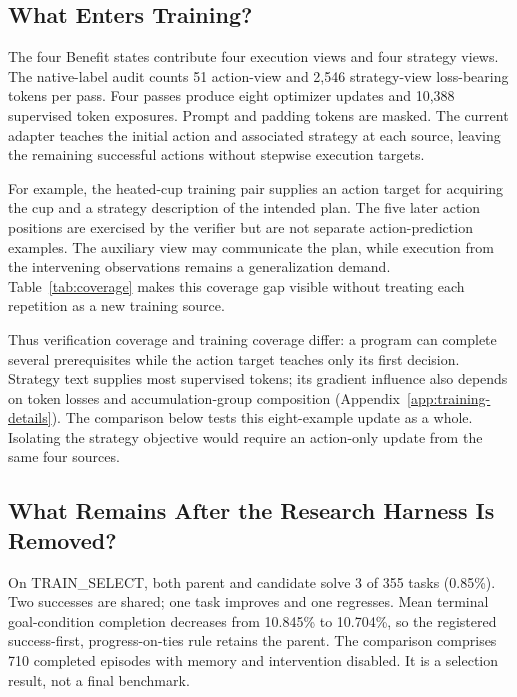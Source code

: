 \subsection{What Enters Training?}
\label{sec:target-results}\label{sec:ablations}
The four Benefit states contribute four execution views and four strategy
views. The native-label audit counts 51 action-view and 2,546 strategy-view
loss-bearing tokens per pass. Four passes produce eight optimizer updates
and 10,388 supervised token exposures. Prompt and padding tokens are
masked. The current adapter teaches the initial action and associated strategy
at each source, leaving the remaining successful actions without
stepwise execution targets.


For example, the heated-cup training pair supplies an action target for
acquiring the cup and a strategy description of the intended plan. The
five later action positions are exercised by the verifier but are not
separate action-prediction examples. The auxiliary view may communicate
the plan, while execution from the intervening observations remains a
generalization demand. Table~\ref{tab:coverage} makes this coverage gap
visible without treating each repetition as a new training source.

Thus verification coverage and training coverage differ: a program can
complete several prerequisites while the action target teaches only its
first decision. Strategy text supplies most supervised tokens; its gradient influence
also depends on token losses and accumulation-group composition
(Appendix~\ref{app:training-details}). The comparison below tests this
eight-example update as a whole. Isolating the strategy objective would
require an action-only update from the same four sources.

\subsection{What Remains After the Research Harness Is Removed?}
\label{sec:main-results}

On TRAIN\_SELECT, both parent and candidate solve 3 of 355 tasks (0.85\%).
Two successes are shared; one task improves and one regresses. Mean terminal
goal-condition completion decreases from 10.845\% to 10.704\%, so the
registered success-first, progress-on-ties rule retains the parent.
The comparison comprises 710 completed episodes with memory and
intervention disabled. It is a selection result, not a final benchmark.

